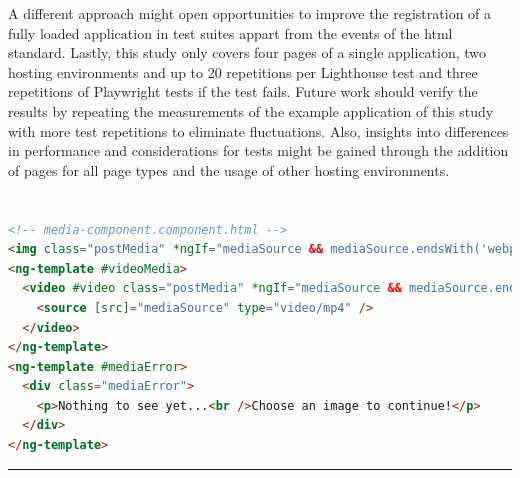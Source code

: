\documentclass[a4paper, 12pt]{article}
\makeatletter
\renewcommand\lstlistoflistings{
  \section{\lstlistlistingname}
  \@starttoc{lol}%
}
\makeatother
\begin{document}
A different approach might open opportunities to improve the registration of a fully loaded application in test suites appart from the events of the \acrshort{html} standard.
Lastly, this study only covers four pages of a single application, two hosting environments and up to 20 repetitions per Lighthouse test and three repetitions of Playwright tests if the test fails.
Future work should verify the results by repeating the measurements of the example application of this study with more test repetitions to eliminate fluctuations.
Also, insights into differences in performance and considerations for tests might be gained through the addition of pages for all page types and the usage of other hosting environments. 

\pagebreak

\appendix

\lstlistoflistings

\pagebreak

\begin{lstlisting}[caption=MediaComponent in Angular (Template), label={lst:Angular:MediaComponent:Template}, language=HTML]
<!-- media-component.component.html -->
<img class="postMedia" *ngIf="mediaSource && mediaSource.endsWith('webp'); else videoMedia" [ngSrc]="mediaSource" [alt]="alt" [width]="width?.endsWith('%') ? 600 : width" [height]="height || (width?.endsWith('%') ? 600 : width)" [id]="id" [class]="class" [sizes]="width!" [priority]="priority" />
<ng-template #videoMedia>
  <video #video class="postMedia" *ngIf="mediaSource && mediaSource.endsWith('mp4'); else mediaError" [attr.width]="width" controls controlslist="nodownload,nofullscreen,noremoteplayback" disablepictureinpicture loop [muted]="true" preload="metadata" >
    <source [src]="mediaSource" type="video/mp4" />
  </video>
</ng-template>
<ng-template #mediaError>
  <div class="mediaError">
    <p>Nothing to see yet...<br />Choose an image to continue!</p>
  </div>
</ng-template>
\end{lstlisting}

\vspace{0.5cm} \hrule \vspace{0.5cm}
\end{document}
